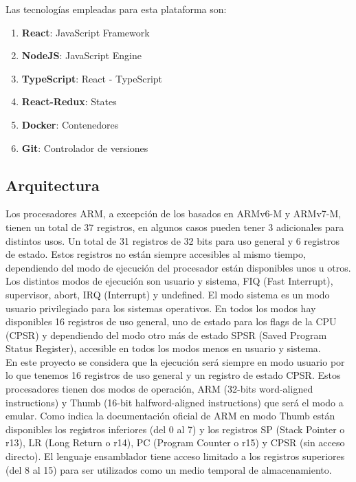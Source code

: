 {    Las tecnologías empleadas para esta plataforma son:
    \begin{enumerate}
        \item \textbf{React}: JavaScript Framework
        \item \textbf{NodeJS}: JavaScript Engine
        \item \textbf{TypeScript}: React - TypeScript
        \item \textbf{React-Redux}: States
        \item \textbf{Docker}: Contenedores
        \item \textbf{Git}: Controlador de versiones
    \end{enumerate}

    \subsection{Arquitectura}
    Los procesadores ARM, a excepción  de los basados en ARMv6-M y ARMv7-M, tienen un total de 37 registros, en algunos casos pueden tener 3 adicionales para distintos usos.
    Un total de 31 registros de 32 bits para uso general y 6 registros de estado. Estos registros no están siempre accesibles al mismo tiempo, dependiendo del modo de ejecución del procesador están disponibles unos u otros.
    Los distintos modos de ejecución son usuario y sistema, FIQ (Fast Interrupt), supervisor, abort, IRQ (Interrupt) y undefined.
    El modo sistema es un modo usuario privilegiado para los sistemas operativos.
    En todos los modos hay disponibles 16 registros de uso general, uno de estado para los flags de la CPU (CPSR) y dependiendo del modo otro más de estado SPSR (Saved Program Status Register), accesible en todos los modos menos en usuario y sistema. \\

    En este proyecto se considera que la ejecución será siempre en modo usuario por lo que tenemos 16 registros de uso general y un registro de estado CPSR.
    Estos procesadores tienen dos modos de operación, ARM (32-bits word-aligned instructions) y Thumb (16-bit halfword-aligned instructions) que será el modo a emular.
    Como indica la documentación oficial de ARM  en modo Thumb están disponibles los registros inferiores (del 0 al 7) y los registros SP (Stack Pointer o r13), LR (Long Return o r14), PC (Program Counter o r15) y CPSR (sin acceso directo).
    El lenguaje ensamblador tiene acceso limitado a los registros superiores (del 8 al 15) para ser utilizados como un medio temporal de almacenamiento.

}
